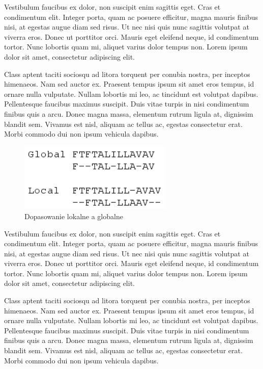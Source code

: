 \documentclass[a4paper,12pt]{article}
\begin{document}
Vestibulum faucibus ex dolor, non suscipit enim sagittis eget. Cras et condimentum elit. Integer porta, quam ac posuere efficitur, magna mauris finibus nisi, at egestas augue diam sed risus. Ut nec nisi quis nunc sagittis volutpat at viverra eros. Donec ut porttitor orci. Mauris eget eleifend neque, id condimentum tortor. Nunc lobortis quam mi, aliquet varius dolor tempus non. Lorem ipsum dolor sit amet, consectetur adipiscing elit.

Class aptent taciti sociosqu ad litora torquent per conubia nostra, per inceptos himenaeos. Nam sed auctor ex. Praesent tempus ipsum sit amet eros tempus, id ornare nulla vulputate. Nullam lobortis mi leo, ac tincidunt est volutpat dapibus. Pellentesque faucibus maximus suscipit. Duis vitae turpis in nisi condimentum finibus quis a arcu. Donec magna massa, elementum rutrum ligula at, dignissim blandit sem. Vivamus est nisl, aliquam ac tellus ac, egestas consectetur erat. Morbi commodo dui non ipsum vehicula dapibus.

\begin{figure}[h]
  \vspace{5pt}
  \centering
  \begin{center}
  \includegraphics[width=0.65\textwidth]{images/global-local-alignment.png}
  \end{center}
  \caption{Dopasowanie lokalne a globalne}
 \end{figure}
Vestibulum faucibus ex dolor, non suscipit enim sagittis eget. Cras et condimentum elit. Integer porta, quam ac posuere efficitur, magna mauris finibus nisi, at egestas augue diam sed risus. Ut nec nisi quis nunc sagittis volutpat at viverra eros. Donec ut porttitor orci. Mauris eget eleifend neque, id condimentum tortor. Nunc lobortis quam mi, aliquet varius dolor tempus non. Lorem ipsum dolor sit amet, consectetur adipiscing elit.

Class aptent taciti sociosqu ad litora torquent per conubia nostra, per inceptos himenaeos. Nam sed auctor ex. Praesent tempus ipsum sit amet eros tempus, id ornare nulla vulputate. Nullam lobortis mi leo, ac tincidunt est volutpat dapibus. Pellentesque faucibus maximus suscipit. Duis vitae turpis in nisi condimentum finibus quis a arcu. Donec magna massa, elementum rutrum ligula at, dignissim blandit sem. Vivamus est nisl, aliquam ac tellus ac, egestas consectetur erat. Morbi commodo dui non ipsum vehicula dapibus.
\end{document}
